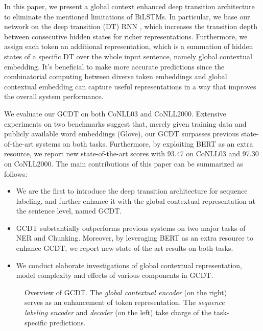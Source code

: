 \documentclass[11pt,a4paper]{article}
\begin{document}
In this paper, we present a global context enhanced deep transition architecture to eliminate the mentioned limitations of BiLSTMs. In particular, we base our network on the deep transition (DT) RNN \cite{DT_language_model},  which increases the transition depth between consecutive hidden states for richer representations. Furthermore, we assign each token an additional representation, which is a summation of hidden states of a specific DT over the whole input sentence, namely global contextual embedding. It's beneficial to make more accurate predictions since the combinatorial computing between diverse token embeddings and global contextual embedding can capture useful representations in a way that improves the overall system performance.

We evaluate our GCDT on both CoNLL03 and CoNLL2000. Extensive experiments on two benchmarks suggest that, merely given training data and publicly available word embeddings (Glove), our GCDT surpasses previous state-of-the-art systems on both tasks. Furthermore, by exploiting BERT as an extra resource, we report new state-of-the-art  scores with 93.47 on CoNLL03 and 97.30 on CoNLL2000.
The main contributions of this paper can be summarized as follows:
\begin{itemize}
\item We are the first to introduce the deep transition architecture for sequence labeling, and further enhance it with the global contextual representation at the sentence level, named GCDT.

\item GCDT substantially outperforms previous systems on two major tasks of NER and Chunking. Moreover, by leveraging BERT as an extra resource to enhance GCDT, we report new state-of-the-art results on both tasks. 

\item We conduct elaborate investigations of global contextual representation, model complexity and effects of various components in GCDT.
\end{itemize}

\begin{figure*}[t!]
\begin{center}
      \caption{Overview of GCDT. The \emph{global contextual encoder} (on the right) serves as an enhancement of token representation. The \emph{sequence labeling encoder} and \emph{decoder} (on the left) take charge of the task-specific predictions. } \label{overview}  \vspace{-2pt}
 \end{center} \vspace{-2pt}
\end{figure*}
\end{document}
